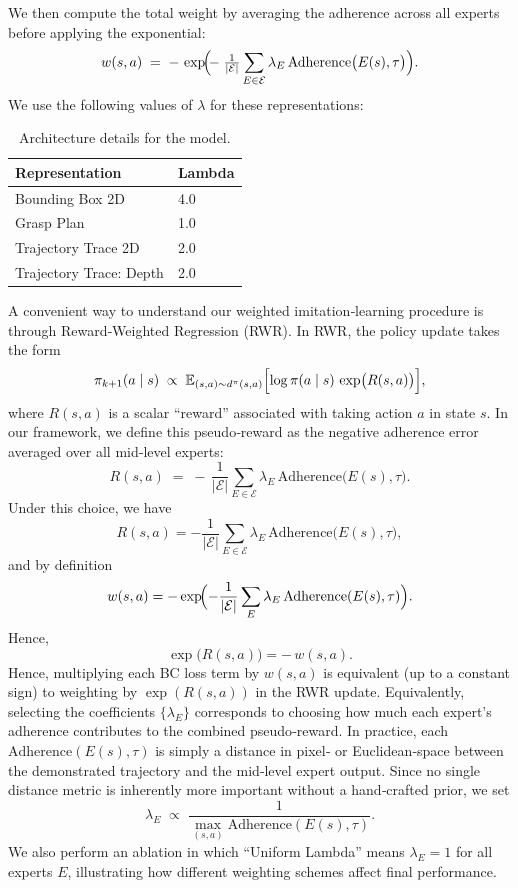 \documentclass[conference,dvipsnames]{IEEEtran}
\begin{document}
We then compute the total weight by averaging the adherence across all experts before applying the exponential:
\[
w(s, a) \;=\; -\,\exp\!\Bigl(\!-\;\tfrac{1}{|\mathcal{E}|}\sum_{E\in \mathcal{E}} \lambda_{E}\,\mathrm{Adherence}\bigl(E(s), \tau\bigr)\Bigr).
\]
We use the following values of $\lambda$ for these representations:

\begin{table}[h]
    \centering
    \begin{tabular}{l|l} %
        \hline
        \textbf{Representation}                  & \textbf{Lambda} \\
        \hline
        Bounding Box 2D & 4.0\\
        Grasp Plan & 1.0 \\
        Trajectory Trace 2D & 2.0 \\
        Trajectory Trace: Depth & 2.0 \\
        \hline
    \end{tabular}
    \caption{Architecture details for the model.}
    \label{tab:architecture_details}
\end{table}

A convenient way to understand our weighted imitation‐learning procedure is through Reward‐Weighted Regression (RWR). In RWR, the policy update takes the form
\[
  \pi_{k+1}(a\mid s) \;\propto\; \mathbb{E}_{(s,a)\sim d^{\pi}(s,a)}\Bigl[\log \pi(a \mid s)\,\exp\bigl(R(s,a)\bigr)\Bigr],
\]
where \(R(s,a)\) is a scalar “reward” associated with taking action \(a\) in state \(s\).  In our framework, we define this pseudo‐reward as the negative adherence error averaged over all mid‐level experts:
\[
  R(s,a) \;=\; -\,\frac{1}{|\mathcal{E}|}\sum_{E\in \mathcal{E}} \lambda_{E}\,\mathrm{Adherence}\bigl(E(s),\tau\bigr).
\]
Under this choice, we have
\[
R(s,a) = -\frac{1}{|\mathcal{E}|}\sum_{E\in\mathcal{E}}\lambda_E\,\mathrm{Adherence}\bigl(E(s),\tau\bigr),
\]
and by definition
\[
w(s,a) = -\exp\!\Bigl(-\frac{1}{|\mathcal{E}|}\sum_{E}\lambda_E\,\mathrm{Adherence}(E(s),\tau)\Bigr).
\]
Hence,
\[
\exp\bigl(R(s,a)\bigr)
= -\,w(s,a).
\]
Hence, multiplying each BC loss term by \(w(s,a)\) is equivalent (up to a constant sign) to weighting by \(\exp(R(s,a))\) in the RWR update.  Equivalently, selecting the coefficients \(\{\lambda_{E}\}\) corresponds to choosing how much each expert’s adherence contributes to the combined pseudo‐reward.  In practice, each \(\mathrm{Adherence}(E(s),\tau)\) is simply a distance in pixel‐ or Euclidean‐space between the demonstrated trajectory and the mid‐level expert output.  Since no single distance metric is inherently more important without a hand‐crafted prior, we set
\[
  \lambda_{E} \;\propto\; \frac{1}{\max_{(s,a)} \mathrm{Adherence}(E(s),\tau)}.
\]
We also perform an ablation in which “Uniform Lambda” means \(\lambda_{E}=1\) for all experts \(E\), illustrating how different weighting schemes affect final performance.
\end{document}
